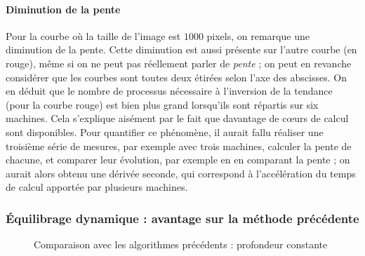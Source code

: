 \paragraph{Diminution de la pente}
Pour la courbe où la taille de l'image est $1000$ pixels, on remarque
une diminution de la pente. Cette diminution est aussi présente sur
l'autre courbe (en rouge), même si on ne peut pas réellement parler de
\emph{pente} ; on peut en revanche considérer que les courbes sont
toutes deux étirées selon l'axe des abscisses. On en déduit que le
nombre de processus nécessaire à l'inversion de la tendance (pour la
courbe rouge) est bien plus grand lorsqu'ils sont répartis sur six
machines. Cela s'explique aisément par le fait que davantage de cœurs
de calcul sont disponibles. Pour quantifier ce phénomène, il aurait
fallu réaliser une troisième série de mesures, par exemple avec trois
machines, calculer la pente de chacune, et comparer leur évolution,
par exemple en en comparant la pente ; on aurait alors obtenu une
dérivée seconde, qui correspond à l'accélération du temps de calcul
apportée par plusieurs machines.


\subsubsection{Équilibrage dynamique : avantage sur la méthode
  précédente}


\begin{figure}
  \centering


  \caption{Comparaison avec les algorithmes précédents : profondeur
    constante}
  \label{fig:mandel:dyn:comp-stat-taille}
\end{figure}

